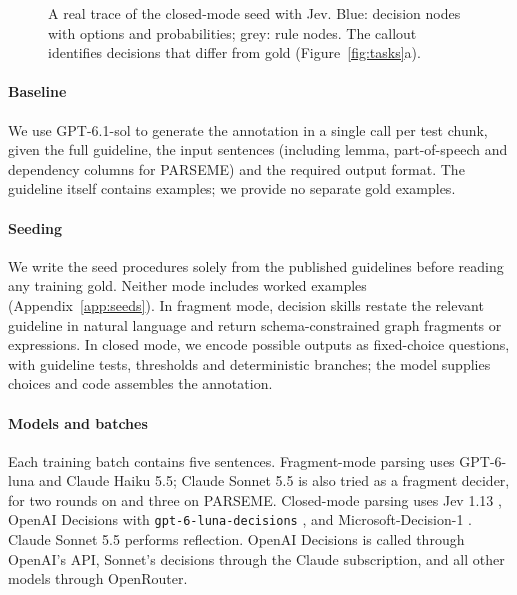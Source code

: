 \begin{figure}[t]
{}
\caption{A real trace of the closed-mode \umr seed with Jev. Blue: decision nodes with options and probabilities; grey: rule nodes. The callout identifies decisions that differ from gold (Figure~\ref{fig:tasks}a).}
\label{fig:walk}
\end{figure}

\paragraph{Baseline}
We use GPT-6.1-sol to generate the annotation in a single call per test chunk, given the full guideline, the input sentences (including lemma, part-of-speech and dependency columns for PARSEME) and the required output format. The guideline itself contains examples; we provide no separate gold examples.

\paragraph{Seeding}
We write the seed procedures solely from the published guidelines before reading any training gold. Neither mode includes worked examples (Appendix~\ref{app:seeds}). In fragment mode, decision skills restate the relevant guideline in natural language and return schema-constrained graph fragments or expressions. In closed mode, we encode possible outputs as fixed-choice questions, with guideline tests, thresholds and deterministic branches; the model supplies choices and code assembles the annotation.

\paragraph{Models and batches}
Each training batch contains five sentences. Fragment-mode parsing uses GPT-6-luna and Claude Haiku 5.5; Claude Sonnet 5.5 is also tried as a fragment decider, for two rounds on \umr and three on PARSEME. Closed-mode parsing uses Jev 1.13 \citep{typesafe2026jev}, OpenAI Decisions with \texttt{gpt-6-luna-decisions} \citep{openai2026decisions}, and Microsoft-Decision-1 \citep{microsoft2026decision}. Claude Sonnet 5.5 performs reflection. OpenAI Decisions is called through OpenAI's API, Sonnet's \umr decisions through the Claude subscription, and all other models through OpenRouter.

